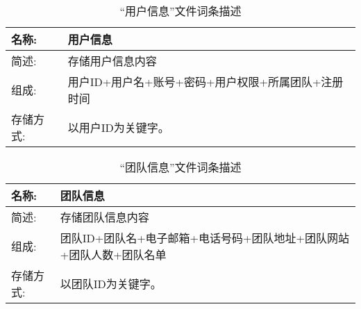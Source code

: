 \begin{table}[H]  
\caption{“用户信息”文件词条描述}  
\begin{center}  
    \begin{tabular}{l p{10cm}} 
        \hline
        \quad 名称:  &   用户信息 \\
        \hline
        \quad 简述:  & 存储用户信息内容\\
        \hline
        \quad 组成:  & 用户ID+用户名+账号+密码+用户权限+所属团队+注册时间 \\
        \hline
        \quad 存储方式:  & 以用户ID为关键字。 \\
        \hline
    \end{tabular}
    \label{tab1}
\end{center}
\end{table}


\begin{table}[H]  
\caption{“团队信息”文件词条描述}  
\begin{center}  
    \begin{tabular}{l p{10cm}} 
        \hline
        \quad 名称:  &   团队信息 \\
        \hline
        \quad 简述:  & 存储团队信息内容\\
        \hline
        \quad 组成:  & 团队ID+团队名+电子邮箱+电话号码+团队地址+团队网站+团队人数+团队名单 \\
        \hline
        \quad 存储方式:  & 以团队ID为关键字。 \\
        \hline
    \end{tabular}
    \label{tab1}
\end{center}
\end{table}
